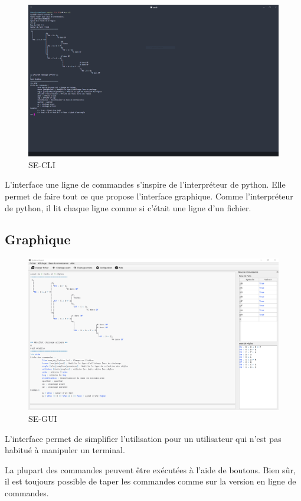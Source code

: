 \documentclass[a4paper, 11pt]{article}
\begin{document}
\begin{figure}[H]
    \centering
    \includegraphics[width=12cm]{cli.png}
    \caption{\label{cli} SE-CLI}
\end{figure}

L'interface une ligne de commandes s'inspire de l'interpréteur de python. Elle permet de faire tout ce que propose l'interface graphique. Comme l'interpréteur de python, il lit chaque ligne comme si c'était une ligne d'un fichier.

\subsection{Graphique}

\begin{figure}[H]
    \centering
    \includegraphics[width=12cm]{gui.png}
    \caption{\label{gui} SE-GUI}
\end{figure}

L'interface permet de simplifier l'utilisation pour un utilisateur qui n'est pas habitué à manipuler un terminal.

La plupart des commandes peuvent être exécutées à l'aide de boutons. Bien sûr, il est toujours possible de taper les commandes comme sur la version en ligne de commandes.
\end{document}
